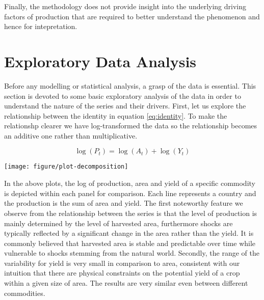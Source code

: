 \documentclass[nojss]{jss}\usepackage{graphicx, color}
\newenvironment{knitrout}{}{} %
\begin{document}
Finally, the methodology does not provide insight into the
underlying driving factors of production that are required to better understand the phenomenon and hence for
intepretation.



\section{Exploratory Data Analysis}




Before any modelling or statistical analysis, a grasp of the data is
essential. This section is devoted to some basic exploratory analysis
of the data in order to understand the nature of the series and their
drivers. First, let us explore the relationship between the identity
in equation \ref{eq:identity}. To make the relationshp clearer we have
log-transformed the data so the relationship becomes an additive one
rather than multiplicative.

\begin{equation}
  \label{eq:logIdentity}
  \log(P_t) = \log(A_t) + \log(Y_t)
\end{equation}



















\begin{knitrout}
\color{fgcolor}

{\centering \texttt{[image: figure/plot-decomposition]} 

}



\end{knitrout}


In the above plots, the log of production, area and yield of a
specific commodity is depicted within each panel for comparison. Each
line represents a country and the production is the sum of area and
yield. The first noteworthy feature we observe from the relationship
between the series is that the level of production is mainly
determined by the level of harvested area, furthermore shocks are
typically reflected by a significant change in the area rather than
the yield. It is commonly believed that harvested area is stable and
predictable over time while vulnerable to shocks stemming from the
natural world.  Secondly, the range of the variability for yield is
very small in comparison to area, consistent with our intuition that
there are physical constraints on the potential yield of a crop within
a given size of area. The results are very similar even between
different commodities.
\end{document}
